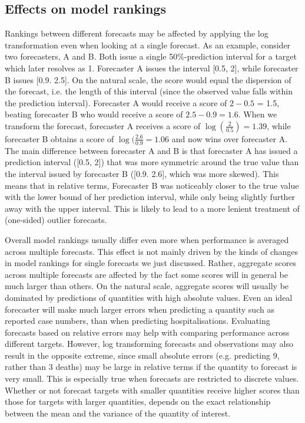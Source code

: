 \documentclass{article}
\begin{document}
\subsection{Effects on model rankings}
Rankings between different forecasts may be affected by applying the log transformation even when looking at a single forecast. As an example, consider two forecasters, A and B. Both issue a single 50\%-prediction interval for a target which later resolves as 1. Forecaster A issues the interval [0.5, 2], while forecaster B issues [0.9. 2.5]. On the natural scale, the score would equal the dispersion of the forecast, i.e. the length of this interval (since the observed value falls within the prediction interval). Forecaster A would receive a score of $2 - 0.5$ = 1.5, beating forecaster B who would receive a score of $2.5 - 0.9 = 1.6$. When we transform the forecast, forecaster A receives a score of $\log (\frac{2}{0.5}) = 1.39$, while forecaster B obtains a score of $\log (\frac{2.6}{0.9} = 1.06$ and now wins over forecaster A. The main difference between forecaster A and B is that forecaster A has issued a prediction interval ([0.5, 2]) that was more symmetric around the true value than the interval issued by forecaster B ([0.9. 2.6], which was more skewed). This means that in relative terms, Forecaster B was noticeably closer to the true value with the lower bound of her prediction interval, while only being slightly further away with the upper interval. This is likely to lead to a more lenient treatment of (one-sided) outlier forecasts. 

Overall model rankings usually differ even more when performance is averaged across multiple forecasts. This effect is not mainly driven by the kinds of changes in model rankings for single forecasts we just discussed. Rather, aggregate scores across multiple forecasts are affected by the fact some scores will in general be much larger than others. On the natural scale, aggregate scores will usually be dominated by predictions of quantities with high absolute values. Even an ideal forecaster will make much larger errors when predicting a quantity such as reported case numbers, than when predicting hospitalisations. Evaluating forecasts based on relative errors may help with comparing performance across different targets. However, log transforming forecasts and observations may also result in the opposite extreme, since small absolute errors (e.g. predicting 9, rather than 3 deaths) may be large in relative terms if the quantity to forecast is very small. This is especially true when forecasts are restricted to discrete values. 
Whether or not forecast targets with smaller quantities receive higher scores than those for targets with larger quantities, depends on the exact relationship between the mean and the variance of the quantity of interest. 
\end{document}
